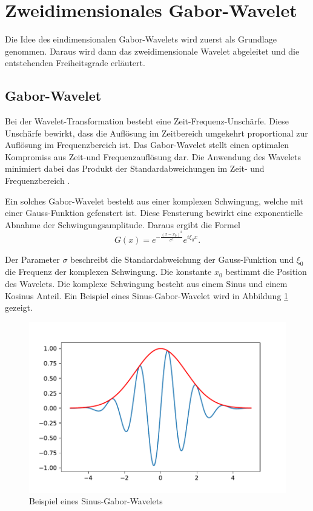 \section{Zweidimensionales Gabor-Wavelet}

Die Idee des eindimensionalen Gabor-Wavelets wird zuerst als Grundlage genommen. 
Daraus wird dann das zweidimensionale Wavelet abgeleitet und die entstehenden Freiheitsgrade erläutert.

\subsection{Gabor-Wavelet}

Bei der Wavelet-Transformation besteht eine Zeit-Frequenz-Unschärfe.
Diese Unschärfe bewirkt, dass die Auflösung im Zeitbereich umgekehrt proportional zur Auflösung im Frequenzbereich ist.
Das Gabor-Wavelet stellt einen optimalen Kompromiss aus Zeit-und Frequenzauflösung dar.
Die Anwendung des Wavelets minimiert dabei das Produkt der Standardabweichungen im Zeit- und Frequenzbereich \cite{paper:communication}.

Ein solches Gabor-Wavelet besteht aus einer komplexen Schwingung, welche mit einer Gauss-Funktion gefenstert ist.
Diese Fensterung bewirkt eine exponentielle Abnahme der Schwingungsamplitude.
Daraus ergibt die Formel
\begin{equation}\label{eq:1d_gabor}
G(x)= e^{-\frac{(x-x_{0})^{2}}{\sigma^{2}}} e^{i\xi_{0}x}.
\end{equation}

Der Parameter $\sigma$ beschreibt die Standardabweichung der Gauss-Funktion und $\xi_{0}$ die Frequenz der komplexen Schwingung. 
Die konstante $x_0$ bestimmt die Position des Wavelets.
Die komplexe Schwingung besteht aus einem Sinus und einem  Kosinus Anteil. 
Ein Beispiel eines Sinus-Gabor-Wavelet wird in Abbildung \ref{fig:gabor1d} gezeigt.

\begin{figure}
	\centering
	\includegraphics[width=0.7\linewidth]{./papers/visuell/images/gabor_1d}
	\caption{Beispiel eines Sinus-Gabor-Wavelets}
	\label{fig:gabor1d}
\end{figure}


